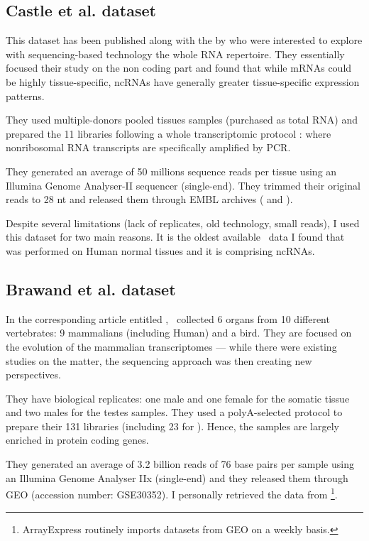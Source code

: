 \subsection{Castle et al. dataset}

This dataset has been published along with the 
by \citet{castleData} who were interested to explore
with sequencing-based technology the whole RNA repertoire. They essentially
focused their study on the non coding part and found that
while \glspl{mRNA} could be highly tissue-specific, \glspl{ncRNA} have generally
greater tissue-specific expression patterns.

They used multiple-donors pooled tissues samples (purchased as total \gls{RNA})
and prepared the 11 libraries following a whole transcriptomic protocol
\citep{Armour:2009}: where nonribosomal \gls{RNA} transcripts are
specifically amplified by \gls{PCR}.

They generated an average of 50 millions sequence reads per tissue
using an Illumina Genome Analyser-II sequencer (single-end).
They trimmed their original reads to 28 \gls{nt}
and released them through EMBL archives (
and ).

Despite several limitations (lack of replicates, old technology, small reads),
I used this dataset for two main reasons. It is the oldest available \Rnaseq\
data I found that was performed on Human normal tissues and it is comprising
\glspl{ncRNA}.

\subsection{Brawand et al. dataset}

In the corresponding article entitled ,
\citet{VTpaper}~collected 6 organs from 10 different vertebrates:
9 mammalians (including Human) and a bird. They are focused on the
evolution of the mammalian transcriptomes --- while there were existing studies
on the matter, the sequencing approach was then creating new perspectives.

They have biological replicates: one male
and one female for the somatic tissue and two males for the testes samples.
They used a polyA-selected protocol to prepare their 131 libraries (including 23
for \species{Homo sapiens}).
Hence, the samples are largely enriched in protein coding genes.

They generated an average of 3.2 billion reads of 76 base pairs per sample
using an Illumina Genome Analyser IIx (single-end) and they released them
through \gls{GEO} (accession number: GSE30352).
I personally retrieved the data from
\footnote{ArrayExpress routinely imports
datasets from \gls{GEO} on a weekly basis.}.

